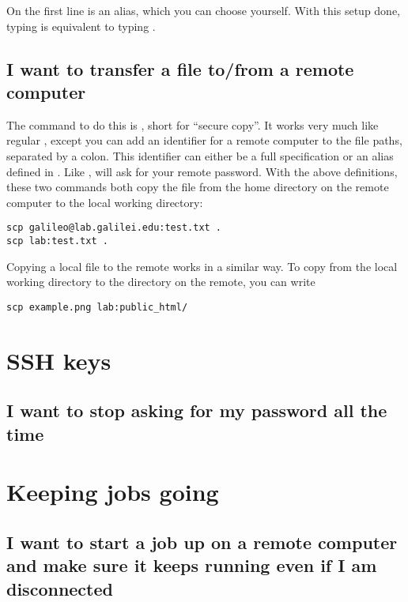 On the first line  is an alias, which you can choose yourself. With
this setup done, typing  is equivalent to typing .

\subsection{I want to transfer a file to/from a remote computer}

The command to do this is , short for ``secure copy''. It works very
much like regular , except you can add an identifier for a remote
computer to the file paths, separated by a colon. This identifier can either be
a full  specification or an alias defined in
. Like ,  will ask for your remote password.
With the above definitions, these two commands both copy the file
 from the home directory on the remote computer to the local
working directory:

\begin{lstlisting}
scp galileo@lab.galilei.edu:test.txt .
scp lab:test.txt .
\end{lstlisting}

Copying a local file to the remote works in a similar way. To copy
 from the local working directory to the 
directory on the remote, you can write

\begin{lstlisting}
scp example.png lab:public_html/
\end{lstlisting}

\section{SSH keys}

\subsection{I want to stop  asking for my password all the time}


\section{Keeping jobs going}

\subsection{I want to start a job up on a remote computer and make sure it
keeps running even if I am disconnected}

